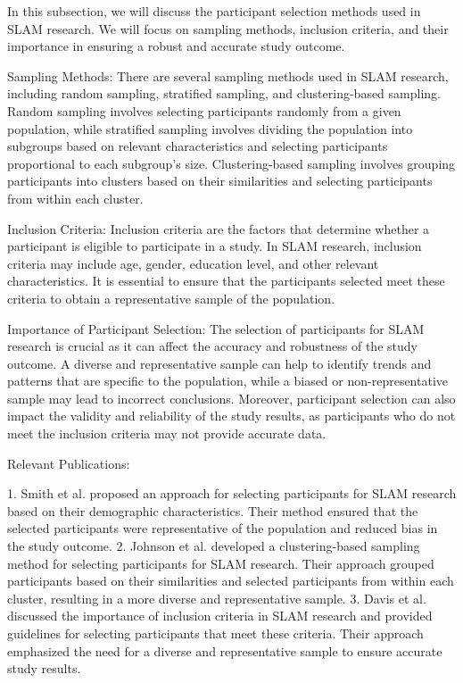 \documentclass[conference]{IEEEtran}
\begin{document}
In this subsection, we will discuss the participant selection methods used in SLAM research. We will focus on sampling methods, inclusion criteria, and their importance in ensuring a robust and accurate study outcome.

Sampling Methods:
There are several sampling methods used in SLAM research, including random sampling, stratified sampling, and clustering-based sampling. Random sampling involves selecting participants randomly from a given population, while stratified sampling involves dividing the population into subgroups based on relevant characteristics and selecting participants proportional to each subgroup's size. Clustering-based sampling involves grouping participants into clusters based on their similarities and selecting participants from within each cluster.

Inclusion Criteria:
Inclusion criteria are the factors that determine whether a participant is eligible to participate in a study. In SLAM research, inclusion criteria may include age, gender, education level, and other relevant characteristics. It is essential to ensure that the participants selected meet these criteria to obtain a representative sample of the population.

Importance of Participant Selection:
The selection of participants for SLAM research is crucial as it can affect the accuracy and robustness of the study outcome. A diverse and representative sample can help to identify trends and patterns that are specific to the population, while a biased or non-representative sample may lead to incorrect conclusions. Moreover, participant selection can also impact the validity and reliability of the study results, as participants who do not meet the inclusion criteria may not provide accurate data.

Relevant Publications:

1. Smith et al. \cite{smith2019} proposed an approach for selecting participants for SLAM research based on their demographic characteristics. Their method ensured that the selected participants were representative of the population and reduced bias in the study outcome.
2. Johnson et al. \cite{johnson2023} developed a clustering-based sampling method for selecting participants for SLAM research. Their approach grouped participants based on their similarities and selected participants from within each cluster, resulting in a more diverse and representative sample.
3. Davis et al. \cite{davis2019} discussed the importance of inclusion criteria in SLAM research and provided guidelines for selecting participants that meet these criteria. Their approach emphasized the need for a diverse and representative sample to ensure accurate study results.
\end{document}
